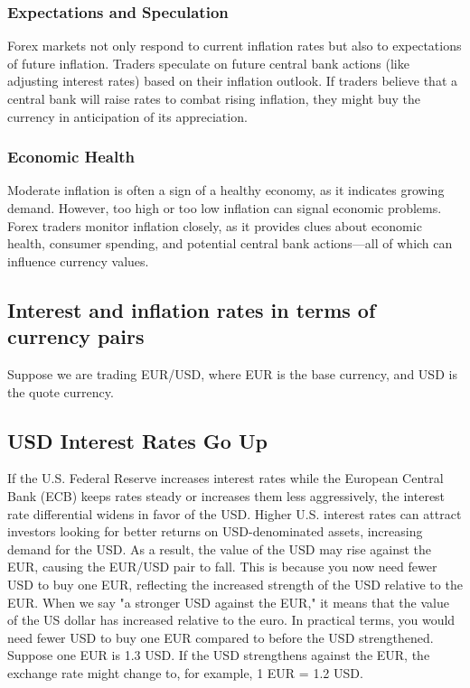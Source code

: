 \documentclass{report}
\begin{document}
     \subsubsection{Expectations and Speculation}
     \bigbreak \noindent 
     Forex markets not only respond to current inflation rates but also to expectations of future inflation. Traders speculate on future central bank actions (like adjusting interest rates) based on their inflation outlook. If traders believe that a central bank will raise rates to combat rising inflation, they might buy the currency in anticipation of its appreciation.
     \bigbreak \noindent 
     \subsubsection{Economic Health}
     \bigbreak \noindent 
     Moderate inflation is often a sign of a healthy economy, as it indicates growing demand. However, too high or too low inflation can signal economic problems. Forex traders monitor inflation closely, as it provides clues about economic health, consumer spending, and potential central bank actions—all of which can influence currency values.
     \bigbreak \noindent 
     \subsection{Interest and inflation rates in terms of currency pairs}
     \bigbreak \noindent 
     Suppose we are trading EUR/USD, where EUR is the base currency, and USD is the quote currency.
     \bigbreak \noindent 
     \subsection{USD Interest Rates Go Up}
     \bigbreak \noindent 
     If the U.S. Federal Reserve increases interest rates while the European Central Bank (ECB) keeps rates steady or increases them less aggressively, the interest rate differential widens in favor of the USD. Higher U.S. interest rates can attract investors looking for better returns on USD-denominated assets, increasing demand for the USD. As a result, the value of the USD may rise against the EUR, causing the EUR/USD pair to fall. This is because you now need fewer USD to buy one EUR, reflecting the increased strength of the USD relative to the EUR.
     \bigbreak \noindent 
     When we say "a stronger USD against the EUR," it means that the value of the US dollar has increased relative to the euro. In practical terms, you would need fewer USD to buy one EUR compared to before the USD strengthened.
     \bigbreak \noindent 
     Suppose one EUR is 1.3 USD. If the USD strengthens against the EUR, the exchange rate might change to, for example, 1 EUR = 1.2 USD.
     \bigbreak \noindent 
\end{document}
